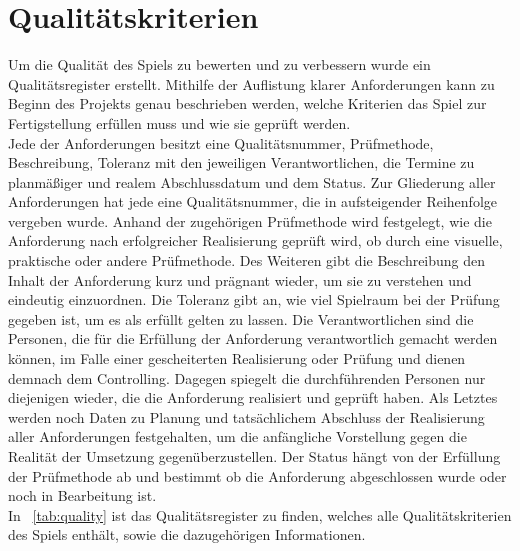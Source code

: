 \chapter{Qualitätskriterien}\label{ch:quality}
Um die Qualität des Spiels zu bewerten und zu verbessern wurde ein Qualitätsregister erstellt. 
Mithilfe der Auflistung klarer Anforderungen kann zu Beginn des Projekts genau beschrieben
werden, welche Kriterien das Spiel zur Fertigstellung erfüllen muss und wie sie geprüft werden.\\
\newline
Jede der Anforderungen besitzt eine Qualitätsnummer, Prüfmethode, Beschreibung, Toleranz mit den jeweiligen 
Verantwortlichen, die Termine zu planmäßiger und realem Abschlussdatum und dem Status.
Zur Gliederung aller Anforderungen hat jede eine Qualitätsnummer, die in aufsteigender Reihenfolge vergeben wurde.
Anhand der zugehörigen Prüfmethode wird festgelegt, wie die Anforderung nach erfolgreicher Realisierung geprüft wird, 
ob durch eine visuelle, praktische oder andere Prüfmethode.
Des Weiteren gibt die Beschreibung den Inhalt der Anforderung kurz und prägnant wieder, um sie zu verstehen
und eindeutig einzuordnen. 
Die Toleranz gibt an, wie viel Spielraum bei der Prüfung gegeben ist, um es als erfüllt gelten 
zu lassen.
Die Verantwortlichen sind die Personen, die für die Erfüllung der Anforderung verantwortlich gemacht werden können,
im Falle einer gescheiterten Realisierung oder Prüfung und dienen demnach dem Controlling.
Dagegen spiegelt die durchführenden Personen nur diejenigen wieder, die die Anforderung realisiert und geprüft haben.
Als Letztes werden noch Daten zu Planung und tatsächlichem Abschluss der Realisierung aller Anforderungen festgehalten,
um die anfängliche Vorstellung gegen die Realität der Umsetzung gegenüberzustellen.
Der Status hängt von der Erfüllung der Prüfmethode ab und bestimmt ob die Anforderung abgeschlossen wurde oder noch in Bearbeitung ist.\\
\newline
In ~\autoref{tab:quality} %
ist das Qualitätsregister zu finden, welches alle Qualitätskriterien des Spiels
enthält, sowie die dazugehörigen Informationen.